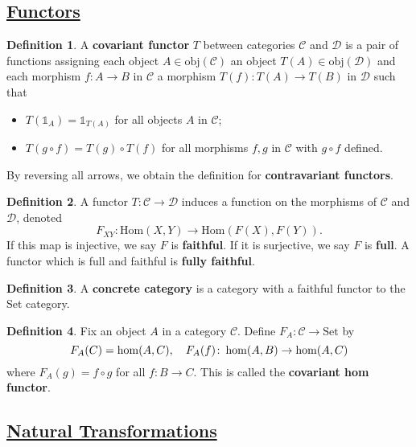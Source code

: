\documentclass[11pt]{amsart}
\theoremstyle{definition}
\newtheorem*{definition*}{Definition}
\renewcommand\:{\colon}
\newcommand{\calC}{\mathcal{C}}
\newcommand{\calD}{\mathcal{D}}
\newcommand{\1}{\mathds{1}}
\newcommand{\Hom}{\text{Hom}}
\newcommand{\obj}{\text{obj}}
\newcommand{\Set}{\text{Set}}
\begin{document}
\subsection*{\underline{Functors}}

\begin{definition*}
	A \textbf{covariant functor} $T$ between categories $\calC$ and $\calD$ is a pair of functions assigning each object $A \in \obj(\calC)$ an object $T(A) \in \obj(\calD)$ and each morphism $f\: A \to B$ in $\calC$ a morphism $T(f) \: T(A) \to T(B)$ in $\calD$ such that
	\begin{itemize}[leftmargin=12.5pt]\setlength\itemsep{0em}
		\item $T(\1_A) = \1_{T(A)}$ for all objects $A$ in $\calC$;
		\item $T(g \circ f) = T(g) \circ T(f)$ for all morphisms $f, g$ in $\calC$ with $g \circ f$ defined.
	\end{itemize}
	By reversing all arrows, we obtain the definition for \textbf{contravariant functors}.
\end{definition*}

\begin{definition*}
	A functor $T\: \calC \to \calD$ induces a function on the morphisms of $\calC$ and $\calD$, denoted \[ F_{XY}\: \Hom(X, Y) \to \Hom(F(X), F(Y)). \] If this map is injective, we say $F$ is \textbf{faithful}. If it is surjective, we say $F$ is \textbf{full}. A functor which is full and faithful is \textbf{fully faithful}.
\end{definition*}

\begin{definition*}
	A \textbf{concrete category} is a category with a faithful functor to the Set category.
\end{definition*}

\begin{definition*}
	Fix an object $A$ in a category $\calC$. Define $F_A\: \calC \to \Set$ by \[ F_A(C) = \hom(A, C), \hskip10pt F_A(f) \: \hom(A, B) \to \hom(A,C) \] where $F_A(g) = f \circ g$ for all $f\: B \to C$. This is called the \textbf{covariant hom functor}.
\end{definition*}

\clearpage %

\subsection*{\underline{Natural Transformations}}
\end{document}
